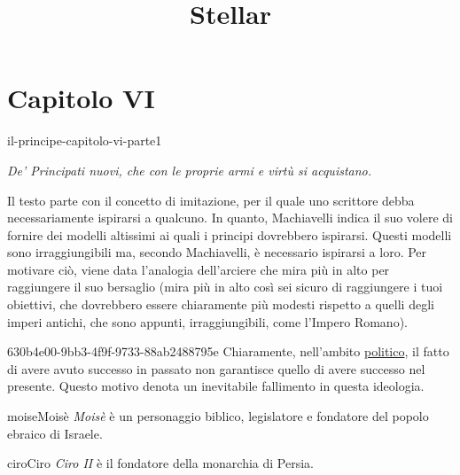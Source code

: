 \documentclass[preview]{standalone}
\begin{document}
\title{Stellar}
\genpage

\section{Capitolo VI}

\begin{snippet}{il-principe-capitolo-vi-parte1}
    \begin{center}
        \begin{minipage}{0.75\textwidth}
            \itshape
            De' Principati nuovi, che con le proprie armi e virtù si acquistano. 
        \end{minipage}
    \end{center}
    \vspace{0.25cm}
    Il testo parte con il concetto di imitazione, per il quale uno scrittore
    debba necessariamente ispirarsi a qualcuno.
    In quanto, Machiavelli indica il suo volere di fornire dei modelli altissimi
    ai quali i principi dovrebbero ispirarsi.
    Questi modelli sono irraggiungibili ma, secondo Machiavelli, è necessario ispirarsi a loro.
    Per motivare ciò, viene data l'analogia dell'arciere che mira più in alto per raggiungere il suo bersaglio
    (mira più in alto così sei sicuro di raggiungere i tuoi obiettivi, che dovrebbero essere chiaramente
    più modesti rispetto a quelli degli imperi antichi, che sono appunti, irraggiungibili, come l'Impero Romano).
\end{snippet}

\begin{snippetnote}{630b4e00-9bb3-4f9f-9733-88ab2488795e}{}
    Chiaramente, nell'ambito \underline{politico}, il fatto di avere avuto successo in passato
    non garantisce quello di avere successo nel presente.
    Questo motivo denota un inevitabile fallimento in questa ideologia.
\end{snippetnote}


\begin{snippetcharacter}{moise}{Moisè}
    \textit{Moisè} è un personaggio biblico, legislatore e fondatore del popolo ebraico di Israele.
\end{snippetcharacter}

\begin{snippetcharacter}{ciro}{Ciro}
    \textit{Ciro II} è il fondatore della monarchia di Persia.
\end{snippetcharacter}
\end{document}
